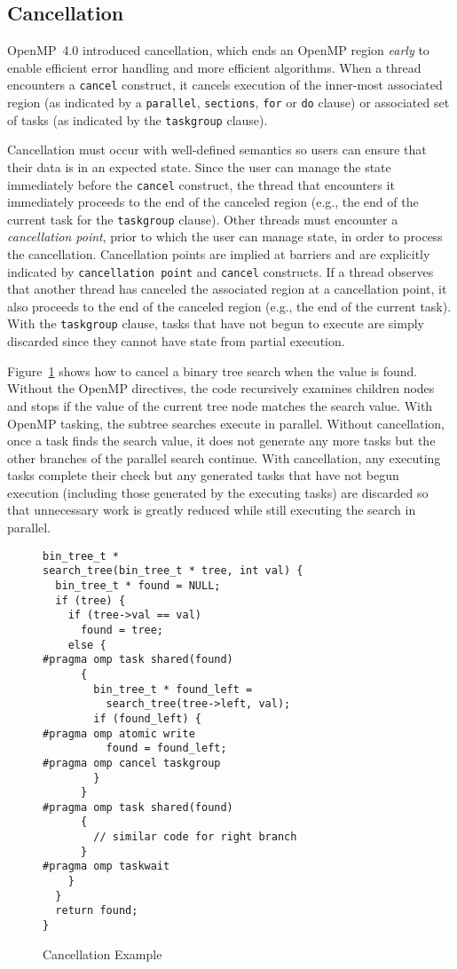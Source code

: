 \subsection{Cancellation}
\label{sec:Cancellation}
OpenMP~4.0 introduced cancellation, which ends an OpenMP region \emph{early}
to enable efficient error handling and more efficient algorithms. When a thread
encounters a \texttt{cancel} construct, it cancels execution of the 
inner-most associated region (as indicated by a \texttt{parallel}, 
\texttt{sections}, \texttt{for} or \texttt{do} clause) or associated set 
of tasks (as indicated by the \texttt{taskgroup} clause). 

Cancellation must occur with well-defined semantics so users can ensure 
that their data is in an expected state. Since the user can manage the 
state immediately before the \texttt{cancel} construct, the thread 
that encounters it immediately proceeds to the end of the canceled region 
(e.g., the end of the current task for the \texttt{taskgroup} clause). Other
threads must encounter a \emph{cancellation point}, prior to which the user 
can manage state, in order to process the cancellation. Cancellation points 
are implied at barriers and are explicitly indicated by 
\texttt{cancellation point} and \texttt{cancel} constructs. If a thread 
observes that another thread has canceled the associated region at a 
cancellation point, it also proceeds to the end of the canceled region 
(e.g., the end of the current task). With the \texttt{taskgroup} clause, 
tasks that have not begun to execute are simply discarded since they cannot 
have state from partial execution.

Figure~\ref{fig:Cancellation} shows how to cancel a binary tree search when 
the value is found. Without the OpenMP directives, the code recursively 
examines children nodes and stops if the value of the current tree node 
matches the search value. With OpenMP tasking, the subtree searches execute
in parallel. Without cancellation, once a task finds the search value, it does
not generate any more tasks but the other branches of the parallel search 
continue. With cancellation, any executing tasks complete their check but 
any generated tasks that have not begun execution (including those 
generated by the executing tasks) are discarded so that unnecessary work 
is greatly reduced while still executing the search in parallel.

\begin{figure}
\begin{verbatim}
bin_tree_t *
search_tree(bin_tree_t * tree, int val) {
  bin_tree_t * found = NULL;
  if (tree) {
    if (tree->val == val)
      found = tree;
    else {
#pragma omp task shared(found)
      {
        bin_tree_t * found_left =
          search_tree(tree->left, val);
        if (found_left) {
#pragma omp atomic write
          found = found_left;
#pragma omp cancel taskgroup
        }
      }
#pragma omp task shared(found)
      {
        // similar code for right branch
      }
#pragma omp taskwait
    }
  }
  return found;
}
\end{verbatim}
\caption{Cancellation Example\label{fig:Cancellation}}
\end{figure}


